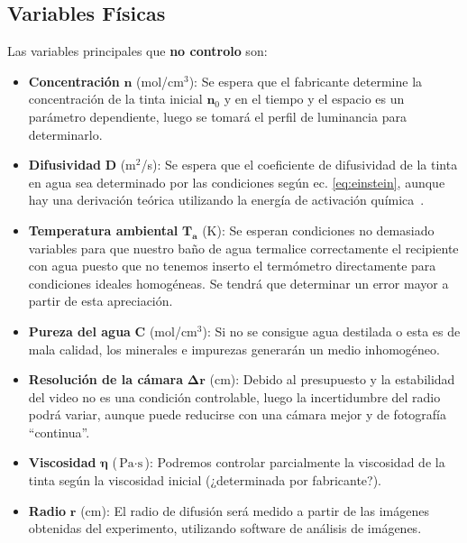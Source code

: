 \documentclass{article}[13pt]
\begin{document}
\subsection*{Variables Físicas}
Las variables principales que \textbf{no controlo} son:
\begin{itemize}
    \item \textbf{Concentración} $\mathbf{n}$ (mol/cm$^3$): Se espera que el fabricante determine la concentración de la tinta inicial $\mathbf{n}_0$ y en el tiempo y el espacio es un parámetro dependiente, luego se tomará el perfil de luminancia para determinarlo.
    \item \textbf{Difusividad} $\mathbf{D}$ (m$^2$/s): Se espera que el coeficiente de difusividad de la tinta en agua sea determinado por las condiciones según ec. \ref{eq:einstein}, aunque hay una derivación teórica utilizando la energía de activación química~\cite{leeInkDifussionWater2004}.
    \item \textbf{Temperatura ambiental} $\mathbf{T_a}$ (K): Se esperan condiciones no demasiado variables para que nuestro baño de agua termalice correctamente el recipiente con agua puesto que no tenemos inserto el termómetro directamente para condiciones ideales homogéneas. Se tendrá que determinar un error mayor a partir de esta apreciación.
    \item \textbf{Pureza del agua} $\mathbf{C}$ (mol/cm$^3$): Si no se consigue agua destilada o esta es de mala calidad, los minerales e impurezas generarán un medio inhomogéneo.
    \item \textbf{Resolución de la cámara} $\mathbf{\Delta r}$ (cm): Debido al presupuesto y la estabilidad del video no es una condición controlable, luego la incertidumbre del radio podrá variar, aunque puede reducirse con una cámara mejor y de fotografía ``continua''.
    \item \textbf{Viscosidad} $\mathbf{\eta}$ ($\unit{\pascal} \cdot \unit{\second}$): Podremos controlar parcialmente la viscosidad de la tinta según la viscosidad inicial (¿determinada por fabricante?).
    \item \textbf{Radio} $\mathbf{r}$ (cm): El radio de difusión será medido a partir de las imágenes obtenidas del experimento, utilizando software de análisis de imágenes.
\end{itemize}
\end{document}
